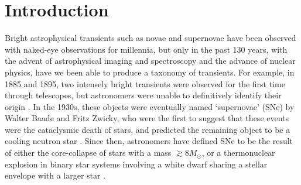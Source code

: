 \chapter{Introduction}
\label{chap:introduction}

% 
%
%
Bright astrophysical transients such as novae and supernovae have been observed with naked-eye observations for millennia, but only in the past 130 years, with the advent of astrophysical imaging and spectroscopy and the advance of nuclear physics, have we been able to produce a taxonomy of transients. 
%
For example, in 1885 and 1895, two intensely bright transients were observed for the first time through telescopes, but astronomers were unable to definitively identify their origin \parencite{deVaucouleurs1985, Schaefer1995}. In the 1930s, these objects were eventually named `supernovae' (SNe) by Walter Baade and Fritz Zwicky, who were the first to suggest that these events were the cataclysmic death of stars, and predicted the remaining object to be a cooling neutron star \parencite{Baade1934}. Since then, astronomers 
have defined SNe to be the result of either the core-collapse of stars with a mass $\gtrsim 8M_\odot$, or a thermonuclear explosion in binary star systems involving a white dwarf sharing a stellar envelope with a larger star \parencite{Filippenko1997}. 

